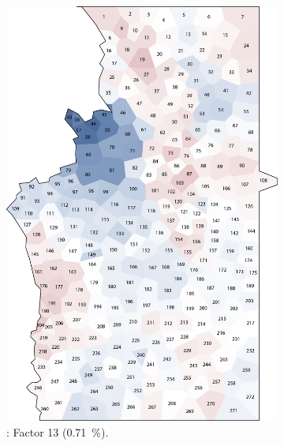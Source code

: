 \documentclass[output=paper]{LSP/langsci}
\begin{document}
\begin{figure}
\begin{subfigure}[t]{0.3\textwidth}
\includegraphics[width=\textwidth]{illustrations/pickl_fig15}
\caption{: Factor 13 (0.71~\%).}
\label{fig:15}
\end{subfigure}   
~
\begin{subfigure}[t]{0.3\textwidth}

\end{subfigure}
\end{figure}
\end{document}
